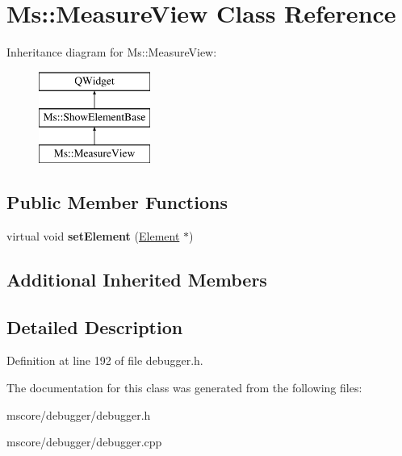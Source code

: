 \hypertarget{class_ms_1_1_measure_view}{}\section{Ms\+:\+:Measure\+View Class Reference}
\label{class_ms_1_1_measure_view}
Inheritance diagram for Ms\+:\+:Measure\+View\+:\begin{figure}[H]
\begin{center}
\leavevmode
\includegraphics[height=3.000000cm]{class_ms_1_1_measure_view}
\end{center}
\end{figure}
\subsection*{Public Member Functions}
\begin{DoxyCompactItemize}
\item 
\mbox{\label{class_ms_1_1_measure_view_a83841a79a71d87d6bfdb935160d4fad2}} 
virtual void {\bfseries set\+Element} (\hyperlink{class_ms_1_1_element}{Element} $\ast$)
\end{DoxyCompactItemize}
\subsection*{Additional Inherited Members}


\subsection{Detailed Description}


Definition at line 192 of file debugger.\+h.



The documentation for this class was generated from the following files\+:\begin{DoxyCompactItemize}
\item 
mscore/debugger/debugger.\+h\item 
mscore/debugger/debugger.\+cpp\end{DoxyCompactItemize}
